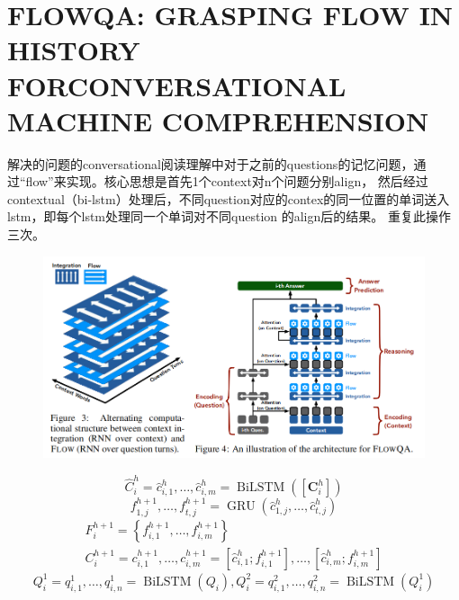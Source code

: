 \documentclass[a4paper,UTF8]{article}
\numberwithin{equation}{section}
\begin{document}
\newpage
\section{FLOWQA: GRASPING FLOW IN HISTORY FORCONVERSATIONAL MACHINE COMPREHENSION}
解决的问题的conversational阅读理解中对于之前的questions的记忆问题，通过“flow”来实现。核心思想是首先1个context对n个问题分别align，
然后经过contextual（bi-lstm）处理后，不同question对应的contex的同一位置的单词送入lstm，即每个lstm处理同一个单词对不同question 的align后的结果。
重复此操作三次。
\begin{figure}[H]
	\centering
	\includegraphics[width=\textwidth]{10-1.png}
\end{figure}
\begin{equation}
	\hat{C}_{i}^{h}=\hat{c}_{i, 1}^{h}, \ldots, \hat{c}_{i, m}^{h}=\operatorname{BiLSTM}\left(\left[\boldsymbol{C}_{i}^{h}\right]\right)
	\end{equation}
	\begin{equation}
		f_{1, j}^{h+1}, \ldots, f_{t, j}^{h+1}=\operatorname{GRU}\left(\hat{c}_{1, j}^{h}, \ldots, \hat{c}_{t, j}^{h}\right)
		\end{equation}
		\begin{equation}
		\begin{array}{c}{F_{i}^{h+1}=\left\{f_{i, 1}^{h+1}, \ldots, f_{i, m}^{h+1}\right\}} \\ {C_{i}^{h+1}=c_{i, 1}^{h+1}, \ldots, c_{i, m}^{h+1}=\left[\hat{c}_{i, 1}^{h} ; f_{i, 1}^{h+1}\right], \ldots,\left[\hat{c}_{i, m}^{h} ; f_{i, m}^{h+1}\right]}\end{array}
		\end{equation}
		\begin{equation}
			Q_{i}^{1}=q_{i, 1}^{1}, \ldots, q_{i, n}^{1}=\operatorname{BiLSTM}\left(Q_{i}\right), Q_{i}^{2}=q_{i, 1}^{2}, \ldots, q_{i, n}^{2}=\operatorname{BiLSTM}\left(Q_{i}^{1}\right)
			\end{equation}
\end{document}
